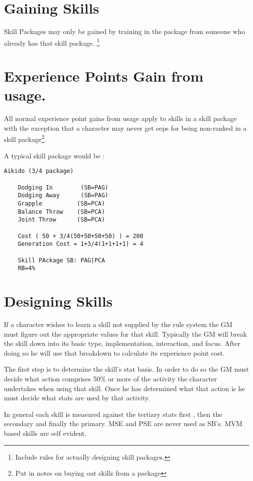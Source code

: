 \section{Gaining Skills}
Skill Packages may only be gained by training in the package from
someone who already has that skill package. \footnote{ Include rules for
actually designing skill packages. }

\section{Experience Points Gain from usage.}

All normal experience point gains from usage apply to skills in a skill
package with the exception that a character may never get eeps for
being non-ranked in a skill package\footnote{Put in notes on buying
out skills from a package}.

A typical skill package would be :

\begin{verbatim}
Aikido (3/4 package)

	Dodging In		  (SB=PAG)
	Dodging Away	  (SB=PAG)
	Grapple			 (SB=PCA)
	Balance Throw	 (SB=PCA)
	Joint Throw		 (SB=PCA)

	Cost ( 50 + 3/4(50+50+50+50) ) = 200
	Generation Cost = 1+3/4(1+1+1+1) = 4

	Skill PAckage SB: PAG|PCA
	RB=4%

\end{verbatim}

\section{Designing Skills}

If a character wishes to learn a skill not supplied by the rule
system the GM must figure out the appropriate values for that skill.
Typically the GM will break the skill down into its basic type,
implementation, interaction, and focus. After doing so he will use
that breakdown to calculate its experience point cost.

The first step is to determine the skill's stat basis. In order to do
so the GM must decide what action comprises 50\% or more of the activity
the character undertakes when using that skill. Once he has determined
what that action is he must decide what stats are used by that activity.

In general each skill is measured against the tertiary stats first , then the
secondary and finally the primary. MSE and PSE are never used as SB's.
MVM based skills are self evident.


